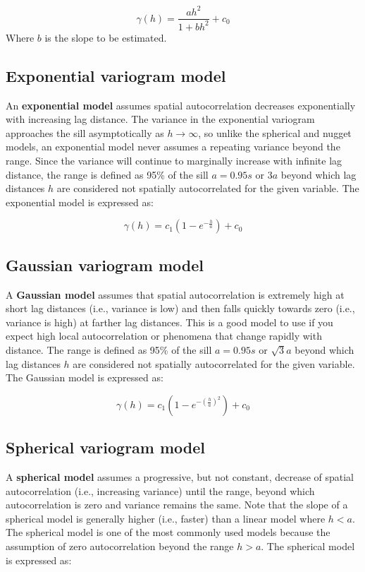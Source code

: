 \documentclass[
]{book}
\begin{document}
\[
\gamma{(h)} = \frac{ah^2}{1+bh^2}+c_0
\]
Where \(b\) is the slope to be estimated.

\hypertarget{exponential-variogram-model}{%
\subsection{Exponential variogram model}\label{exponential-variogram-model}}

An \textbf{exponential model} assumes spatial autocorrelation decreases exponentially with increasing lag distance. The variance in the exponential variogram approaches the sill asymptotically as \(h → ∞\), so unlike the spherical and nugget models, an exponential model never assumes a repeating variance beyond the range. Since the variance will continue to marginally increase with infinite lag distance, the range is defined as 95\% of the sill \(a=0.95s\) or \(3a\) beyond which lag distances \(h\) are considered not spatially autocorrelated for the given variable. The exponential model is expressed as:

\[
\gamma{(h)} = c_1(1-e^{-\frac{h}{a}})+c_0
\]

\hypertarget{gaussian-variogram-model}{%
\subsection{Gaussian variogram model}\label{gaussian-variogram-model}}

A \textbf{Gaussian model} assumes that spatial autocorrelation is extremely high at short lag distances (i.e., variance is low) and then falls quickly towards zero (i.e., variance is high) at farther lag distances. This is a good model to use if you expect high local autocorrelation or phenomena that change rapidly with distance. The range is defined as 95\% of the sill \(a=0.95s\) or \(\sqrt{3}a\) beyond which lag distances \(h\) are considered not spatially autocorrelated for the given variable. The Gaussian model is expressed as:

\[
\gamma{(h)} = c_1(1-e^{-(\frac{h}{a})^2})+c_0
\]

\hypertarget{spherical-variogram-model}{%
\subsection{Spherical variogram model}\label{spherical-variogram-model}}

A \textbf{spherical model} assumes a progressive, but not constant, decrease of spatial autocorrelation (i.e., increasing variance) until the range, beyond which autocorrelation is zero and variance remains the same. Note that the slope of a spherical model is generally higher (i.e., faster) than a linear model where \(h<a\). The spherical model is one of the most commonly used models because the assumption of zero autocorrelation beyond the range \(h>a\). The spherical model is expressed as:
\end{document}
